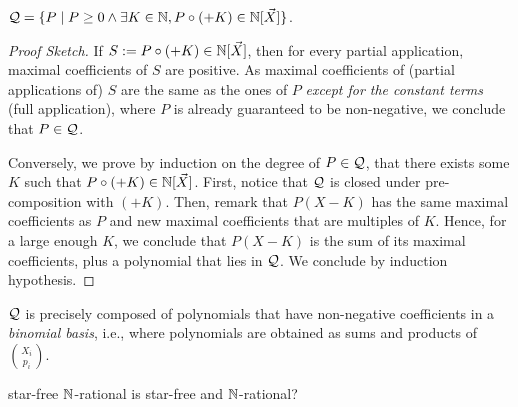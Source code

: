 \documentclass[a4paper,11pt]{article}
\begin{document}
\begin{conjecture}
    $\mathcal{Q} = \mathopen{\{} P \mid  P \geq 0 \wedge \exists K \in \mathbb{N}, P \circ (+K) \in \mathbb{N}[\vec{X}] \mathclose{\}}$.
\end{conjecture}
\begin{proof}[Proof Sketch]
    If $S \mathrel{:=} P \circ (+K) \in \mathbb{N}[\vec{X}]$, then for every partial application,
    maximal coefficients of $S$ are positive. As maximal coefficients of 
    (partial applications of) $S$ are the same as the ones of $P$
    \emph{except for the constant terms} (full application),
    where $P$ is already guaranteed to be non-negative, we conclude
    that $P \in \mathcal{Q}$.

    Conversely, we prove by induction on the degree of $P \in \mathcal{Q}$,
    that there exists some $K$ such that $P \circ (+K) \in \mathbb{N}[\vec{X}]$.
    First, notice that $\mathcal{Q}$ is closed under pre-composition with
    $(+K)$. Then, remark that $P(X - K)$ has the same maximal coefficients as
    $P$ and new maximal coefficients that are multiples of $K$. Hence, for a
    large enough $K$, we conclude that $P(X - K)$ is the sum of its maximal
    coefficients, plus a polynomial that lies in $\mathcal{Q}$. We conclude by
    induction hypothesis. 
\end{proof}

\begin{conjecture}
    $\mathcal{Q}$ is precisely composed of polynomials that
    have non-negative coefficients in a \emph{binomial basis},
    i.e., where polynomials are obtained
    as sums and products of $\binom{X_i}{p_i}$.
\end{conjecture}

\begin{conjecture}
    star-free $\mathbb{N}$-rational is star-free and $\mathbb{N}$-rational?
\end{conjecture}

\printbibliography

\appendix
\end{document}

